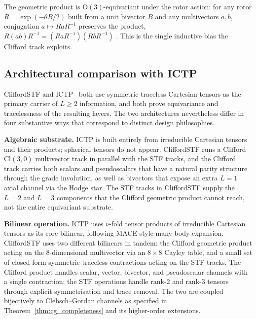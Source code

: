 The geometric product is $\mathrm{O}(3)$-equivariant under the rotor action: for any rotor $R = \exp(-\theta B/2)$ built from a unit bivector $B$ and any multivectors $a, b$, conjugation $a \mapsto RaR^{-1}$ preserves the product, $R(ab)R^{-1} = (RaR^{-1})(RbR^{-1})$ \citep{doran2003geometric}. This is the single inductive bias the Clifford track exploits.


\subsection{Architectural comparison with ICTP}\label{supp:ictp}

CliffordSTF and ICTP~\citep{zaverkin2024ictp} both use symmetric traceless Cartesian tensors as the primary carrier of $L \geq 2$ information, and both prove equivariance and tracelessness of the resulting layers. The two architectures nevertheless differ in four substantive ways that correspond to distinct design philosophies.

\textbf{Algebraic substrate.} ICTP is built entirely from irreducible Cartesian tensors and their products; spherical tensors do not appear. CliffordSTF runs a Clifford $\mathrm{Cl}(3,0)$ multivector track in parallel with the STF tracks, and the Clifford track carries both scalars and pseudoscalars that have a natural parity structure through the grade involution, as well as bivectors that expose an extra $L{=}1$ axial channel via the Hodge star. The STF tracks in CliffordSTF supply the $L{=}2$ and $L{=}3$ components that the Clifford geometric product cannot reach, not the entire equivariant substrate.

\textbf{Bilinear operation.} ICTP uses $\nu$-fold tensor products of irreducible Cartesian tensors as its core bilinear, following MACE-style many-body expansion. CliffordSTF uses two different bilinears in tandem: the Clifford geometric product acting on the 8-dimensional multivector via an $8 \times 8$ Cayley table, and a small set of closed-form symmetric-traceless contractions acting on the STF tracks. The Clifford product handles scalar, vector, bivector, and pseudoscalar channels with a single contraction; the STF operations handle rank-2 and rank-3 tensors through explicit symmetrisation and trace removal. The two are coupled bijectively to Clebsch--Gordan channels as specified in Theorem~\ref{thm:cg_completeness} and its higher-order extensions.

